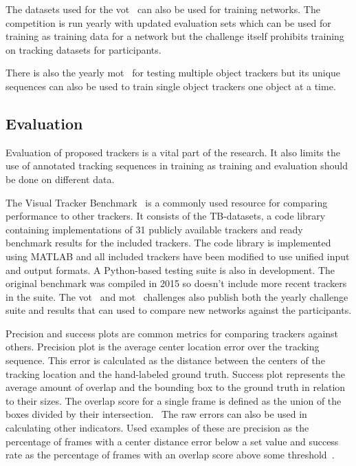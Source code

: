 The datasets used for the \ac{vot}~\cite{VOT} can also be used for training networks. The competition
is run yearly with updated evaluation sets which can be used for training as training
data for a network but the challenge itself prohibits training on tracking datasets for
participants.

There is also the yearly \ac{mot}~\cite{MOT16} for testing multiple object trackers but
its unique sequences can also be used to train single object trackers one object at a
time.

\subsection{Evaluation}
Evaluation of proposed trackers is a vital part of the research. It also limits the use
of annotated tracking sequences in training as training and evaluation should be done
on different data.

The Visual Tracker Benchmark~\cite{VTB} is a commonly used resource for comparing
performance to other trackers. It consists of the TB-datasets, a code library containing
implementations of 31 publicly available trackers and ready benchmark results for the
included trackers. The code library is implemented using MATLAB and all included trackers
have been modified to use unified input and output formats. A Python-based testing suite
is also in development. The original benchmark was compiled in 2015 so doesn't include
more recent trackers in the suite. The \ac{vot}~\cite{VOT} and \ac{mot}~\cite{MOT16}
challenges also publish both the yearly challenge suite and results that can used to
compare new networks against the participants.

Precision and success plots are common metrics for comparing trackers against others.
Precision plot is the average center location error over the tracking sequence. This
error is calculated as the distance between the centers of the tracking location and
the hand-labeled ground truth. Success plot represents the average amount of overlap
and the bounding box to the ground truth in relation to their sizes. The overlap score
for a single frame is defined as the union of the boxes divided by their intersection.~\cite{OT_BENCH}
The raw errors can also be used in calculating other indicators. Used examples of these
are precision as the percentage of frames with a center distance error below a set value
and success rate as the percentage of frames with an overlap score above some threshold~\cite{DEEPTRACK}.
